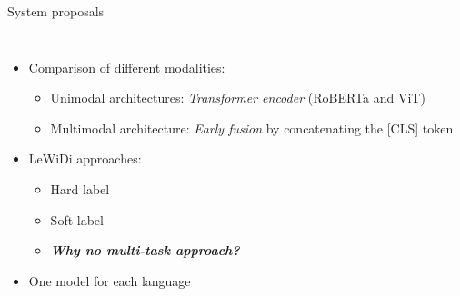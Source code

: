 \begin{frame}{System proposals}

\begin{columns}
        \begin{itemize}
            \item Comparison of different modalities:
                \begin{itemize}
                    \item Unimodal architectures: \textit{Transformer encoder} (RoBERTa and ViT)
                    \item Multimodal architecture: \textit{Early fusion} by concatenating the [CLS] token
                \end{itemize}
            \item LeWiDi approaches:
                \begin{itemize}
                    \item Hard label
                    \item Soft label
                    \item \textbf{\textit{Why no multi-task approach?}}
                \end{itemize}
            \item One model for each language 
    \end{itemize}
    \centering
    
    
\end{columns}
\end{frame}


